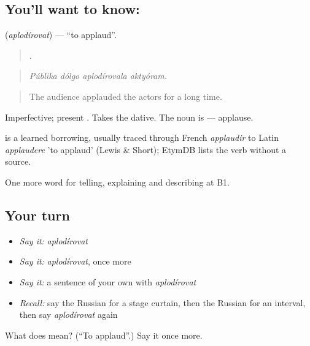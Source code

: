 \subsection*{You'll want to know: }
\textbf{} (\emph{aplodírovat}) — \textquotedblleft{}to applaud\textquotedblright{}.

\begin{quote}
   .
\end{quote}

\begin{quote}
\emph{Públika dólgo aplodírovala aktyóram.}
\end{quote}

\begin{quote}
The audience applauded the actors for a long time.
\end{quote}

Imperfective; present . Takes the dative. The noun is \emph{} — applause.

\begin{cousinweb}
\emph{} is a learned borrowing, usually traced through French \emph{applaudir} to Latin \emph{applaudere} 'to applaud' (Lewis \& Short); EtymDB lists the verb without a source.
\end{cousinweb}

\begin{grammarlens}[title={What you've built}]
One more word for telling, explaining and describing at B1.
\end{grammarlens}

\subsection*{Your turn}
\begin{itemize}
\raggedright
  \item \emph{Say it:} \emph{aplodírovat}
  \item \emph{Say it:} \emph{aplodírovat}, once more
  \item \emph{Say it:} a sentence of your own with \emph{aplodírovat}
  \item \emph{Recall:} say the Russian for a stage curtain, then the Russian for an interval, then say \emph{aplodírovat} again
\end{itemize}

\begin{tcolorbox}[breakable,colback=teal!4,colframe=teal!35!black,title={Before you move on}]
What does  mean? (\textquotedblleft{}To applaud\textquotedblright{}.) Say it once more.
\end{tcolorbox}
